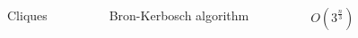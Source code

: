 \begin{minipage}[t]{\textwidth}
    \begin{columns}
        \begin{column}{0.25\textwidth}
        \centering
        Cliques
        \end{column}
    \hfill
        \begin{column}{0.25\textwidth}
        \centering
        Bron-Kerbosch algorithm
        \end{column}
    \hfill
        \begin{column}{0.25\textwidth}
        \centering
        $O(3^{\frac{n}{3}})$
        \end{column}
    \hfill
        \begin{column}{0.25\textwidth}
        \centering
        \resizebox{0.65\textwidth}{!}{}
        \end{column}
    \end{columns}
\end{minipage}